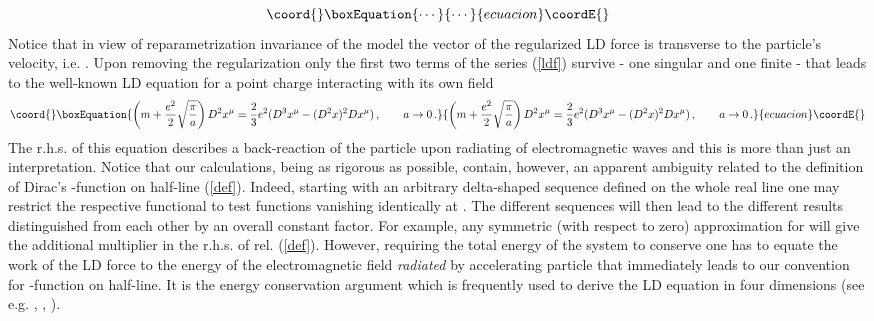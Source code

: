 \documentclass[a4paper,12pt]{article}
\begin{document}
\begin{equation*}\coord{}\boxEquation{
\cdots
}{
\cdots
}{ecuacion}\coordE{}\end{equation*}
Notice that in view of reparametrization invariance of the model the vector
of the regularized LD force is transverse to the particle's velocity, i.e. \coordHE{}. Upon removing the regularization only the
first two terms of the series (\ref{ldf}) survive - one singular and one
finite - that leads to the well-known LD equation for a \coordHE{} point charge
interacting with its own field
\begin{equation}\coord{}\boxEquation{
\left( m+\frac{e^2}2\sqrt{\frac \pi a}\right) D^2x^\mu =\frac 23e^2(D^3x^\mu
-(D^2x)^2Dx^\mu )\,,\qquad a\rightarrow 0\,.  \label{ld4}
}{
\left( m+\frac{e^2}2\sqrt{\frac \pi a}\right) D^2x^\mu =\frac 23e^2(D^3x^\mu
-(D^2x)^2Dx^\mu )\,,\qquad a\rightarrow 0\,.  }{ecuacion}\coordE{}\end{equation}
The r.h.s. of this equation describes a back-reaction of the particle upon
radiating of electromagnetic waves and this is more than just an
interpretation. Notice that our calculations, being as rigorous as possible,
contain, however, an apparent ambiguity related to the definition of Dirac's
\myHighlight{$\delta $}\coordHE{}-function on half-line (\ref{def}). Indeed, starting with an
arbitrary delta-shaped sequence defined on the whole real line one may
restrict the respective functional to test functions vanishing identically
at \coordHE{}. The different sequences will then lead to the different results
distinguished from each other by an overall constant factor. For example,
any symmetric (with respect to zero) approximation for \coordHE{} will
give the additional \coordHE{} multiplier in the r.h.s. of rel. (\ref{def}).
However, requiring the total energy of the system to conserve one has to
equate the work of the LD force to the energy of the electromagnetic field
{\it radiated} by accelerating particle that immediately leads to our
convention for \myHighlight{$\delta $}\coordHE{}-function on half-line. It is the energy
conservation argument which is frequently used to derive the LD equation in
four dimensions (see e.g. \cite{Dirac}, \cite{Jackson}, \cite{Poisson}).
\end{document}
